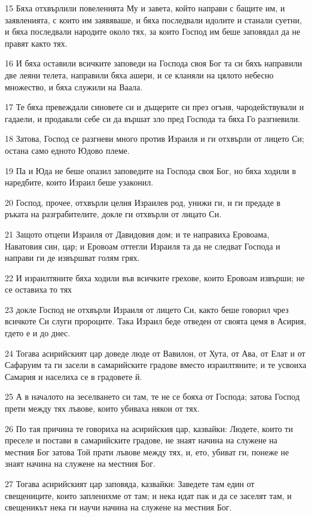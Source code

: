 \par 15 Бяха отхвърлили повеленията Му и завета, който направи с бащите им, и заявленията, с които им заявяваше, и бяха последвали идолите и станали суетни, и бяха последвали народите около тях, за които Господ им беше заповядал да не правят както тях.
\par 16 И бяха оставили всичките заповеди на Господа своя Бог та си бяхъ направили две леяни телета, направили бяха ашери, и се кланяли на цялото небесно множество, и бяха служили на Ваала.
\par 17 Те бяха превеждали синовете си и дъщерите си през огъня, чародействували и гадаели, и продавали себе си да вършат зло пред Господа та бяха Го разгневили.
\par 18 Затова, Господ се разгневи много против Израиля и ги отхвърли от лицето Си; остана само едното Юдово племе.
\par 19 Па и Юда не беше опазил заповедите на Господа своя Бог, но бяха ходили в наредбите, които Израил беше узаконил.
\par 20 Господ, прочее, отхвърли целия Израилев род, унижи ги, и ги предаде в ръката на разграбителите, докле ги отхвърли от лицато Си.
\par 21 Защото отцепи Израиля от Давидовия дом; и те направиха Еровоама, Наватовия син, цар; и Еровоам оттегли Израиля та да не следват Господа и направи ги де извършват голям грях.
\par 22 И израилтяните бяха ходили във всичките грехове, които Еровоам извърши; не се оставиха то тях
\par 23 докле Господ не отхвърли Израиля от лицето Си, както беше говорил чрез всичкоте Си слуги пророците. Така Израил беде отведен от своята цемя в Асирия, гдето е и до днес.
\par 24 Тогава асирийският цар доведе люде от Вавилон, от Хута, от Ава, от Елат и от Сафаруим та ги засели в самарийските градове вместо израилтяните; и те усвоиха Самария и населиха се в градовете й.
\par 25 А в началото на зеселването си там, те не се бояха от Господа; затова Господ прети между тях лъвове, които убиваха някои от тях.
\par 26 По тая причина те говориха на асирийския цар, казвайки: Людете, които ти преселе и постави в самарийските градове, не знаят начина на служене на местния Бог затова Той прати лъвове между тях, и, ето, убиват ги, понеже не знаят начина на служене на местния Бог.
\par 27 Тогава асирийският цар заповяда, казвайки: Заведете там един от свещениците, които запленихме от там; и нека идат пак и да се заселят там, и свещеникът нека ги научи начина на служене на местния Бог.
